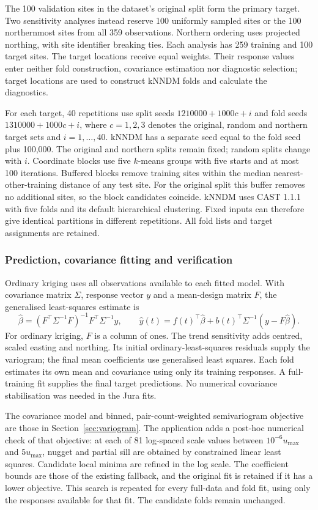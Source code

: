 \documentclass[11pt,a4paper]{article}
\begin{document}
The 100 validation sites in the dataset's original split form the primary target. Two sensitivity analyses instead reserve 100 uniformly sampled sites or the 100 northernmost sites from all 359 observations. Northern ordering uses projected northing, with site identifier breaking ties. Each analysis has 259 training and 100 target sites. The target locations receive equal weights. Their response values enter neither fold construction, covariance estimation nor diagnostic selection; target locations are used to construct kNNDM folds and calculate the diagnostics.

For each target, 40 repetitions use split seeds $1210000+1000c+i$ and fold seeds $1310000+1000c+i$, where $c=1,2,3$ denotes the original, random and northern target sets and $i=1,\ldots,40$. kNNDM has a separate seed equal to the fold seed plus 100,000. The original and northern splits remain fixed; random splits change with $i$. Coordinate blocks use five $k$-means groups with five starts and at most 100 iterations. Buffered blocks remove training sites within the median nearest-other-training distance of any test site. For the original split this buffer removes no additional sites, so the block candidates coincide. kNNDM uses CAST 1.1.1 with five folds and its default hierarchical clustering. Fixed inputs can therefore give identical partitions in different repetitions. All fold lists and target assignments are retained.

\subsubsection{Prediction, covariance fitting and verification}
\label{sec:jura-fitting}
Ordinary kriging uses all observations available to each fitted model. With covariance matrix $\Sigma$, response vector $y$ and a mean-design matrix $F$, the generalised least-squares estimate is
\[
 \widehat\beta=(F^\top\Sigma^{-1}F)^{-1}F^\top\Sigma^{-1}y,
 \qquad
 \widehat y(t)=f(t)^\top\widehat\beta+b(t)^\top\Sigma^{-1}(y-F\widehat\beta).
\]
For ordinary kriging, $F$ is a column of ones. The trend sensitivity adds centred, scaled easting and northing. Its initial ordinary-least-squares residuals supply the variogram; the final mean coefficients use generalised least squares. Each fold estimates its own mean and covariance using only its training responses. A full-training fit supplies the final target predictions. No numerical covariance stabilisation was needed in the Jura fits.

The covariance model and binned, pair-count-weighted semivariogram objective are those in Section~\ref{sec:variogram}. The application adds a post-hoc numerical check of that objective: at each of 81 log-spaced scale values between $10^{-6}u_{\max}$ and $5u_{\max}$, nugget and partial sill are obtained by constrained linear least squares. Candidate local minima are refined in the log scale. The coefficient bounds are those of the existing fallback, and the original fit is retained if it has a lower objective. This search is repeated for every full-data and fold fit, using only the responses available for that fit. The candidate folds remain unchanged.
\end{document}
